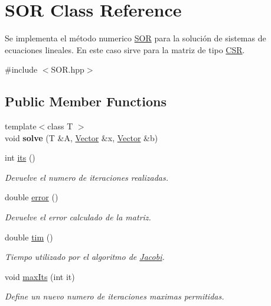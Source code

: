 \hypertarget{class_s_o_r}{}\section{S\+OR Class Reference}
\label{class_s_o_r}


Se implementa el método numerico \hyperlink{class_s_o_r}{S\+OR} para la solución de sistemas de ecuaciones lineales. En este caso sirve para la matriz de tipo \hyperlink{class_c_s_r}{C\+SR}.  




{\ttfamily \#include $<$S\+O\+R.\+hpp$>$}

\subsection*{Public Member Functions}
\begin{DoxyCompactItemize}
\item 
\hypertarget{class_s_o_r_abef2976eb4006f53282a9ea6a4ed3898}{}\label{class_s_o_r_abef2976eb4006f53282a9ea6a4ed3898} 
{\footnotesize template$<$class T $>$ }\\void {\bfseries solve} (T \&A, \hyperlink{class_vector}{Vector} \&x, \hyperlink{class_vector}{Vector} \&b)
\item 
int \hyperlink{class_s_o_r_a8300b64a510db083985308e8355a24ce}{its} ()
\begin{DoxyCompactList}\small\item\em Devuelve el numero de iteraciones realizadas. \end{DoxyCompactList}\item 
double \hyperlink{class_s_o_r_aecaca47519aefd071caaf6c5dc2516a0}{error} ()
\begin{DoxyCompactList}\small\item\em Devuelve el error calculado de la matriz. \end{DoxyCompactList}\item 
double \hyperlink{class_s_o_r_aa592907de2e098a9f13de1ce08fdc00e}{tim} ()
\begin{DoxyCompactList}\small\item\em Tiempo utilizado por el algoritmo de \hyperlink{class_jacobi}{Jacobi}. \end{DoxyCompactList}\item 
void \hyperlink{class_s_o_r_a32b87de870efe119b61b84d0f521e81c}{max\+Its} (int it)
\begin{DoxyCompactList}\small\item\em Define un nuevo numero de iteraciones maximas permitidas. \end{DoxyCompactList}\item 

\end{DoxyCompactItemize}
